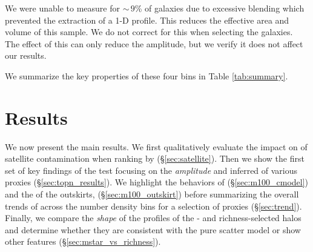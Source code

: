 \documentclass[fleqn,usenatbib,useAMS,english]{mnras}
\begin{document}
    We were unable to measure \mstar{} for $\sim\,9$\% of galaxies due to excessive blending which
    prevented the extraction of a 1-D profile. This reduces the effective area and volume of this sample.
    We do not correct for this when selecting the \topn{} galaxies. The effect of this can
    only reduce the \dsigma{} amplitude, but we verify it does not affect our results.

    We summarize the key properties of these four bins in Table \ref{tab:summary}.




\section{Results}
    \label{sec:result}

    We now present the main results.
    We first qualitatively evaluate the impact on \dsigma{} of satellite contamination when ranking
    by \mstar{} (\S \ref{sec:satellite}).
    Then we show the first set of key findings of the \topn{} test focusing on the {\em amplitude}
    and inferred \sigmh{} of various \mvir{} proxies (\S \ref{sec:topn_results}).
    We highlight the behaviors of \mcmodel{} (\S \ref{sec:m100_cmodel}) and the \mstar{} of the
    outskirts,  (\S \ref{sec:m100_outskirt})
    before summarizing the overall trends of \sigmh{} across the number density bins for a selection
    of \mvir{} proxies (\S \ref{sec:trend}).
    Finally, we compare the {\em shape} of the \dsigma{} profiles of the \mstar{}- and richness-selected
    halos and determine whether they are consistent with the pure scatter model or show other
    features (\S \ref{sec:mstar_vs_richness}).
\end{document}
